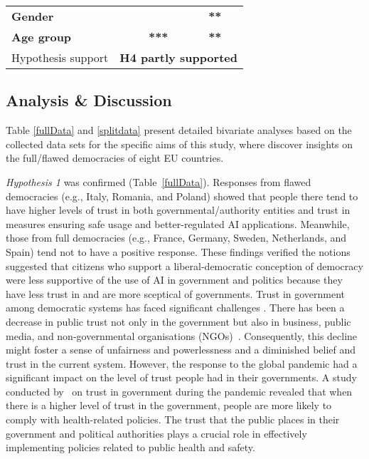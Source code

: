 \documentclass[
]{ceurart}
\begin{document}
\begin{table}
\begin{center}
\begin{tabular}{llllll}
    
    \textbf{Gender}                              &                                & \multicolumn{1}{c}{}             & \multicolumn{1}{c}{}  &   & \textbf{**}         \\
    \cline{1-6}

    
    \textbf{Age group}                           &                                & \multicolumn{1}{c}{}           & \multicolumn{1}{c}{\textbf{***}} &   & \textbf{**} \\
    \cline{1-6}
       \multicolumn{2}{l}{Hypothesis support}    &  \multicolumn{4}{c}{\textbf{H4 partly supported}}
                                                                 
    \end{tabular}
    \end{center}
    \vspace{-1cm}
    \end{table}

\subsection{Analysis \& Discussion}
Table \ref{fullData} and \ref{splitdata} present detailed bivariate analyses based on the collected data sets for the specific aims of this study, where discover insights on the full/flawed democracies of eight EU countries.

\textit{Hypothesis 1} was confirmed (Table~\ref{fullData}). Responses from flawed democracies (e.g., Italy, Romania, and Poland) showed that people there tend to have higher levels of trust in both governmental/authority entities and trust in measures ensuring safe usage and better-regulated AI applications. Meanwhile, those from full democracies (e.g., France, Germany, Sweden, Netherlands, and Spain) tend not to have a positive response. These findings verified the notions suggested that citizens who support a liberal-democratic conception of democracy were less supportive of the use of AI in government and politics \cite{konig2022citizen} because they have less trust in and are more sceptical of governments. Trust in government among democratic systems has faced significant challenges \cite{geana2011health}. There has been a decrease in public trust not only in the government but also in business, public media, and non-governmental organisations (NGOs)~\cite{geana2011health}. Consequently, this decline might foster a sense of unfairness and powerlessness and a diminished belief and trust in the current system. However, the response to the global pandemic had a significant impact on the level of trust people had in their governments. A study conducted 
by~\cite{groeniger2021dutch} on trust in government during the pandemic revealed that when there is a higher level of trust in the government, people are more likely to comply with health-related policies. The trust that the public places in their government and political authorities plays a crucial role in effectively implementing policies related to public health and safety.
\end{document}
